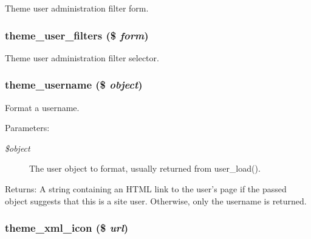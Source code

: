 Theme user administration filter form. \hypertarget{group__themeable_gcd04cb8ff61ecb42564cf48635cf61a9}{
\subsubsection[{theme\_\-user\_\-filters}]{\setlength{\rightskip}{0pt plus 5cm}theme\_\-user\_\-filters (\$ {\em form})}}
\label{group__themeable_gcd04cb8ff61ecb42564cf48635cf61a9}


Theme user administration filter selector. \hypertarget{group__themeable_gf08895a75b95547417a302272e0b027c}{
\subsubsection[{theme\_\-username}]{\setlength{\rightskip}{0pt plus 5cm}theme\_\-username (\$ {\em object})}}
\label{group__themeable_gf08895a75b95547417a302272e0b027c}


Format a username.

\begin{Desc}
\item[Parameters:]
\begin{description}
\item[{\em \$object}]The user object to format, usually returned from user\_\-load(). \end{description}
\end{Desc}
\begin{Desc}
\item[Returns:]A string containing an HTML link to the user's page if the passed object suggests that this is a site user. Otherwise, only the username is returned. \end{Desc}
\hypertarget{group__themeable_ga9cac9d4b695e8c4edd9e324adc0c9fb}{
\subsubsection[{theme\_\-xml\_\-icon}]{\setlength{\rightskip}{0pt plus 5cm}theme\_\-xml\_\-icon (\$ {\em url})}}
\label{group__themeable_ga9cac9d4b695e8c4edd9e324adc0c9fb}


